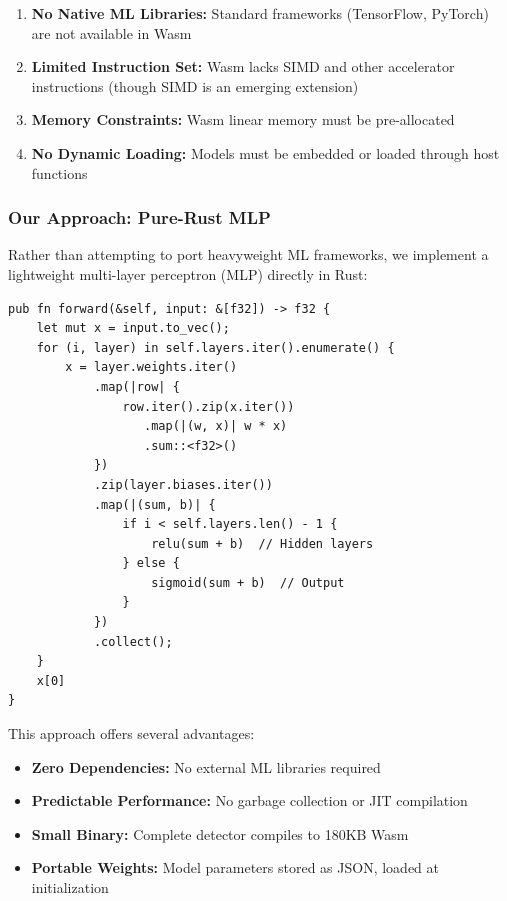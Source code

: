 \begin{enumerate}
    \item \textbf{No Native ML Libraries:} Standard frameworks (TensorFlow, PyTorch) are not available in Wasm
    \item \textbf{Limited Instruction Set:} Wasm lacks SIMD and other accelerator instructions (though SIMD is an emerging extension)
    \item \textbf{Memory Constraints:} Wasm linear memory must be pre-allocated
    \item \textbf{No Dynamic Loading:} Models must be embedded or loaded through host functions
\end{enumerate}

\subsubsection{Our Approach: Pure-Rust MLP}

Rather than attempting to port heavyweight ML frameworks, we implement a lightweight multi-layer perceptron (MLP) directly in Rust:

\begin{lstlisting}[style=rust, caption={Core MLP inference loop in Rust.}]
pub fn forward(&self, input: &[f32]) -> f32 {
    let mut x = input.to_vec();
    for (i, layer) in self.layers.iter().enumerate() {
        x = layer.weights.iter()
            .map(|row| {
                row.iter().zip(x.iter())
                   .map(|(w, x)| w * x)
                   .sum::<f32>()
            })
            .zip(layer.biases.iter())
            .map(|(sum, b)| {
                if i < self.layers.len() - 1 {
                    relu(sum + b)  // Hidden layers
                } else {
                    sigmoid(sum + b)  // Output
                }
            })
            .collect();
    }
    x[0]
}
\end{lstlisting}

This approach offers several advantages:
\begin{itemize}
    \item \textbf{Zero Dependencies:} No external ML libraries required
    \item \textbf{Predictable Performance:} No garbage collection or JIT compilation
    \item \textbf{Small Binary:} Complete detector compiles to 180KB Wasm
    \item \textbf{Portable Weights:} Model parameters stored as JSON, loaded at initialization
\end{itemize}

